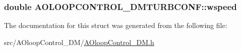 \subsubsection[{wspeed}]{\setlength{\rightskip}{0pt plus 5cm}double A\+O\+L\+O\+O\+P\+C\+O\+N\+T\+R\+O\+L\+\_\+\+D\+M\+T\+U\+R\+B\+C\+O\+N\+F\+::wspeed}\label{structAOLOOPCONTROL__DMTURBCONF_aaac3d0a47b600f128ab17e8d066aa3a2}


The documentation for this struct was generated from the following file\+:\begin{DoxyCompactItemize}
\item 
src/\+A\+Oloop\+Control\+\_\+\+D\+M/\hyperlink{AOloopControl__DM_8h}{A\+Oloop\+Control\+\_\+\+D\+M.\+h}\end{DoxyCompactItemize}
